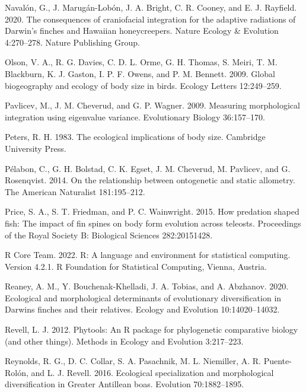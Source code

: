 \documentclass[
  11pt,
]{article}
\begin{document}
\leavevmode\hypertarget{ref-Navalon2020}{}%
Navalón, G., J. Marugán-Lobón, J. A. Bright, C. R. Cooney, and E. J.
Rayfield. 2020. The consequences of craniofacial integration for the
adaptive radiations of Darwin's finches and Hawaiian honeycreepers.
Nature Ecology \& Evolution 4:270--278. Nature Publishing Group.

\leavevmode\hypertarget{ref-Olson2009}{}%
Olson, V. A., R. G. Davies, C. D. L. Orme, G. H. Thomas, S. Meiri, T. M.
Blackburn, K. J. Gaston, I. P. F. Owens, and P. M. Bennett. 2009. Global
biogeography and ecology of body size in birds. Ecology Letters
12:249--259.

\leavevmode\hypertarget{ref-Pavlicev2009}{}%
Pavlicev, M., J. M. Cheverud, and G. P. Wagner. 2009. Measuring
morphological integration using eigenvalue variance. Evolutionary
Biology 36:157--170.

\leavevmode\hypertarget{ref-Peters1983}{}%
Peters, R. H. 1983. The ecological implications of body size. Cambridge
University Press.

\leavevmode\hypertarget{ref-Pelabon2014}{}%
Pélabon, C., G. H. Bolstad, C. K. Egset, J. M. Cheverud, M. Pavlicev,
and G. Rosenqvist. 2014. On the relationship between ontogenetic and
static allometry. The American Naturalist 181:195--212.

\leavevmode\hypertarget{ref-Price2015}{}%
Price, S. A., S. T. Friedman, and P. C. Wainwright. 2015. How predation
shaped fish: The impact of fin spines on body form evolution across
teleosts. Proceedings of the Royal Society B: Biological Sciences
282:20151428.

\leavevmode\hypertarget{ref-RCT}{}%
R Core Team. 2022. R: A language and environment for statistical
computing. Version 4.2.1. R Foundation for Statistical Computing,
Vienna, Austria.

\leavevmode\hypertarget{ref-Reaney2020}{}%
Reaney, A. M., Y. Bouchenak-Khelladi, J. A. Tobias, and A. Abzhanov.
2020. Ecological and morphological determinants of evolutionary
diversification in Darwins finches and their relatives. Ecology and
Evolution 10:14020--14032.

\leavevmode\hypertarget{ref-Revell2012}{}%
Revell, L. J. 2012. Phytools: An R package for phylogenetic comparative
biology (and other things). Methods in Ecology and Evolution 3:217--223.

\leavevmode\hypertarget{ref-Reynolds2016}{}%
Reynolds, R. G., D. C. Collar, S. A. Pasachnik, M. L. Niemiller, A. R.
Puente-Rolón, and L. J. Revell. 2016. Ecological specialization and
morphological diversification in Greater Antillean boas. Evolution
70:1882--1895.
\end{document}
